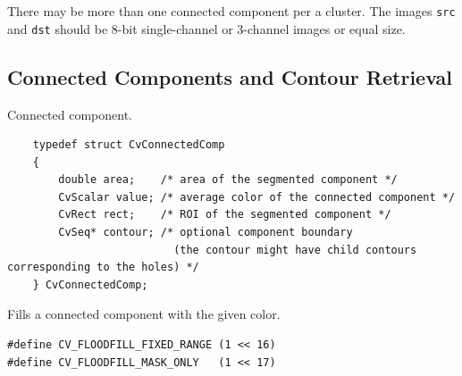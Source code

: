 There may be more than one connected component per a cluster. The images \texttt{src} and \texttt{dst} should be 8-bit single-channel or 3-channel images or equal size.

\subsection{Connected Components and Contour Retrieval}

\label{CvConnectedComp}

Connected component.

\begin{lstlisting}
    typedef struct CvConnectedComp
    {
        double area;    /* area of the segmented component */
        CvScalar value; /* average color of the connected component */
        CvRect rect;    /* ROI of the segmented component */
        CvSeq* contour; /* optional component boundary
                          (the contour might have child contours corresponding to the holes) */
    } CvConnectedComp;

\end{lstlisting}

\label{FloodFill}

Fills a connected component with the given color.


\begin{lstlisting}
#define CV_FLOODFILL_FIXED_RANGE (1 << 16)
#define CV_FLOODFILL_MASK_ONLY   (1 << 17)
\end{lstlisting}

